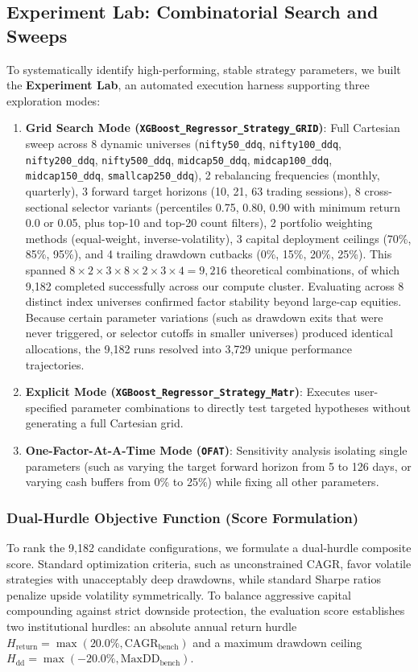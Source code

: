 \subsection{Experiment Lab: Combinatorial Search and Sweeps}
To systematically identify high-performing, stable strategy parameters, we built the \textbf{Experiment Lab}, an automated execution harness supporting three exploration modes:
\begin{enumerate}
    \item \textbf{Grid Search Mode (\texttt{XGBoost\_Regressor\_Strategy\_GRID})}: Full Cartesian sweep across 8 dynamic universes (\texttt{nifty50\_ddq}, \texttt{nifty100\_ddq}, \texttt{nifty200\_ddq}, \texttt{nifty500\_ddq}, \texttt{midcap50\_ddq}, \texttt{midcap100\_ddq}, \texttt{midcap150\_ddq}, \texttt{smallcap250\_ddq}), 2 rebalancing frequencies (monthly, quarterly), 3 forward target horizons (10, 21, 63 trading sessions), 8 cross-sectional selector variants (percentiles 0.75, 0.80, 0.90 with minimum return 0.0 or 0.05, plus top-10 and top-20 count filters), 2 portfolio weighting methods (equal-weight, inverse-volatility), 3 capital deployment ceilings (70\%, 85\%, 95\%), and 4 trailing drawdown cutbacks (0\%, 15\%, 20\%, 25\%). This spanned $8 \times 2 \times 3 \times 8 \times 2 \times 3 \times 4 = 9,216$ theoretical combinations, of which 9,182 completed successfully across our compute cluster. Evaluating across 8 distinct index universes confirmed factor stability beyond large-cap equities. Because certain parameter variations (such as drawdown exits that were never triggered, or selector cutoffs in smaller universes) produced identical allocations, the 9,182 runs resolved into 3,729 unique performance trajectories.
    \item \textbf{Explicit Mode (\texttt{XGBoost\_Regressor\_Strategy\_Matr})}: Executes user-specified parameter combinations to directly test targeted hypotheses without generating a full Cartesian grid.
    \item \textbf{One-Factor-At-A-Time Mode (\texttt{OFAT})}: Sensitivity analysis isolating single parameters (such as varying the target forward horizon from 5 to 126 days, or varying cash buffers from 0\% to 25\%) while fixing all other parameters.
\end{enumerate}

\subsubsection*{Dual-Hurdle Objective Function (Score Formulation)}
To rank the 9,182 candidate configurations, we formulate a dual-hurdle composite score. Standard optimization criteria, such as unconstrained CAGR, favor volatile strategies with unacceptably deep drawdowns, while standard Sharpe ratios penalize upside volatility symmetrically. To balance aggressive capital compounding against strict downside protection, the evaluation score establishes two institutional hurdles: an absolute annual return hurdle $H_{\text{return}} = \max(20.0\%, \text{CAGR}_{\text{bench}})$ and a maximum drawdown ceiling $H_{\text{dd}} = \max(-20.0\%, \text{MaxDD}_{\text{bench}})$. 


